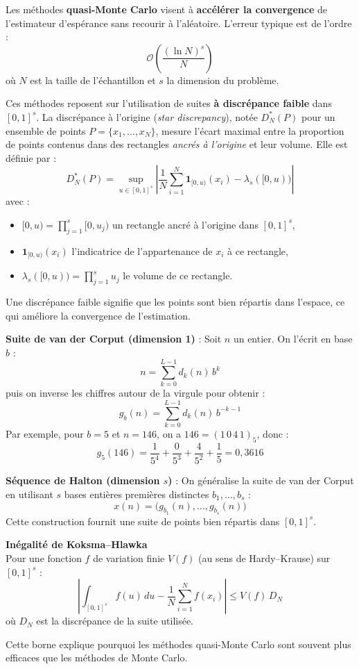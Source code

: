 %
\begin{f}
	
	Les méthodes \textbf{quasi-Monte Carlo} visent à \textbf{accélérer la convergence} de l’estimateur d’espérance sans recourir à l’aléatoire. L’erreur typique est de l’ordre :
	\[
	\mathcal{O}\left( \frac{(\ln N)^s}{N} \right)
	\]
	où \(N\) est la taille de l’échantillon et \(s\) la dimension du problème.
	
	Ces méthodes reposent sur l’utilisation de suites \textbf{à discrépance faible} dans \([0,1]^s\). La discrépance à l'origine (\emph{star discrepancy}), notée  \(D^*_N(P)\) pour un ensemble de points \(P = \{x_1, \ldots, x_N\}\), mesure l’écart maximal entre la proportion de points contenus dans des rectangles \emph{ancrés à l’origine} et leur volume. Elle est définie par :
	\[
	D^*_N(P) = \sup_{u \in [0,1]^s} \left| \frac{1}{N} \sum_{i=1}^N \mathbf{1}_{[0,u)}(x_i) - \lambda_s([0,u)) \right|
	\]
	avec :
	\begin{itemize}
		\item \([0,u) = \prod_{j=1}^s [0, u_j)\) un rectangle ancré à l’origine dans \([0,1]^s\),
		\item \(\mathbf{1}_{[0,u)}(x_i)\) l’indicatrice de l’appartenance de \(x_i\) à ce rectangle,
		\item \(\lambda_s([0,u)) = \prod_{j=1}^s u_j\) le volume de ce rectangle.
	\end{itemize}
	Une discrépance faible signifie que les points sont bien répartis dans l’espace, ce qui améliore la convergence de l’estimation.
	
	\medskip
	\textbf{Suite de van der Corput (dimension 1)} :
	Soit \(n\) un entier. On l’écrit en base \(b\) :
	\[
	n = \sum_{k=0}^{L-1} d_k(n)\, b^k
	\]
	puis on inverse les chiffres autour de la virgule pour obtenir :
	\[
	g_b(n) = \sum_{k=0}^{L-1} d_k(n)\, b^{-k-1}
	\]
	Par exemple, pour \(b = 5\) et \(n = 146\), on a \(146 = (1\,0\,4\,1)_5\), donc :
	\[
	g_5(146) = \frac{1}{5^4} + \frac{0}{5^3} + \frac{4}{5^2} + \frac{1}{5} = 0{,}3616
	\]
	
	\medskip
	\textbf{Séquence de Halton (dimension \(s\))} :
	On généralise la suite de van der Corput en utilisant \(s\) bases entières premières distinctes \(b_1, \dots, b_s\) :
	\[
	x(n) = \big( g_{b_1}(n), \dots, g_{b_s}(n) \big)
	\]
	Cette construction fournit une suite de points bien répartis dans \([0,1]^s\).
	
	\medskip
	\textbf{Inégalité de Koksma–Hlawka}\\
	Pour une fonction \(f\) de variation finie \(V(f)\) (au sens de Hardy–Krause) sur \([0,1]^s\) :
	\[
	\left| \int_{[0,1]^s} f(u)\, du - \frac{1}{N} \sum_{i=1}^N f(x_i) \right| \leq V(f)\, D_N
	\]
	où \(D_N\) est la discrépance de la suite utilisée.
	
Cette borne explique pourquoi les méthodes quasi-Monte Carlo sont souvent plus efficaces que les méthodes de Monte Carlo.
	
	
\end{f}

